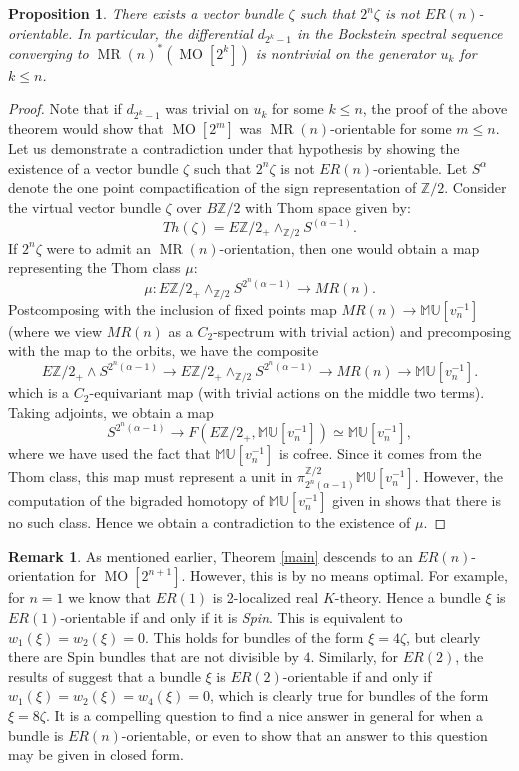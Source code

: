 \documentclass[12pt]{amsart}
\numberwithin{equation}{section}
\theoremstyle{plain}  %
\newtheorem{prop}[equation]{Proposition}
\theoremstyle{definition}  %
\newtheorem{remark}[equation]{Remark}
\newcommand{\Z}{\mathbb{Z}}
\newcommand{\MU}{\mathbb {MU}}
\DeclareMathOperator{\MO}{MO}
\DeclareMathOperator{\MUR}{MR}
\begin{document}
\medskip
\begin{prop} \label{bound}
There exists a vector bundle $\zeta$ such that $2^n \zeta$ is not $ER(n)$-orientable. In particular, the differential $d_{2^k-1}$ in the Bockstein spectral sequence converging to $\MUR(n)^*(\MO[2^k])$ is nontrivial on the generator $u_k$ for $k \leq n$. 
\end{prop}
\begin{proof}
Note that if $d_{2^k-1}$ was trivial on $u_k$ for some $k \leq n$, the proof of the above theorem would show that $\MO[2^m]$ was $\MUR(n)$-orientable for some $m \leq n$. Let us demonstrate a contradiction under that hypothesis by showing the existence of a vector bundle $\zeta$ such that $2^n \zeta$ is not $ER(n)$-orientable. Let $S^{\alpha}$ denote the one point compactification of the sign representation of $\Z/2$. Consider the virtual vector bundle $\zeta$ over $B\Z/2$ with Thom space given by: 
\[ Th(\zeta) = E\Z/2_+ \wedge_{\Z/2} S^{(\alpha-1)}. \] 
If $2^n\zeta$ were to admit an $\MUR(n)$-orientation, then one would obtain a map representing the Thom class $\mu$:
\[ \mu: E\Z/2_+ \wedge_{\Z/2} S^{2^n(\alpha-1)} \longrightarrow MR(n).\]
Postcomposing with the inclusion of fixed points map $MR(n) \longrightarrow \MU[v_n^{-1}]$ (where we view $MR(n)$ as a $C_2$-spectrum with trivial action) and precomposing with the map to the orbits, we have the composite
$$E\Z/2_+ \wedge S^{2^n(\alpha -1)} \longrightarrow E\Z/2_+ \wedge_{\Z/2} S^{2^n(\alpha-1)} \longrightarrow MR(n) \longrightarrow \MU[v_n^{-1}].$$
which is a $C_2$-equivariant map (with trivial actions on the middle two terms). Taking adjoints, we obtain a map
$$S^{2^n(\alpha -1)} \longrightarrow F(E\Z/2_+, \MU[v_n^{-1}])\simeq \MU[v_n^{-1}],$$
where we have used the fact that $\MU[v_n^{-1}]$ is cofree. Since it comes from the Thom class, this map must represent a unit in $\pi_{2^n(\alpha -1)}^{\Z/2}\MU[v_n^{-1}]$. However, the computation of the bigraded homotopy of $\MU[v_n^{-1}]$ given in \cite{HK01} shows that there is no such class. Hence we obtain a contradiction to the existence of $\mu$. 
\end{proof}

\medskip
\begin{remark}
As mentioned earlier, Theorem \ref{main} descends to an $ER(n)$-orientation for $\MO[2^{n+1}]$. However, this is by no means optimal. 
For example, for $n=1$ we know that $ER(1)$ is 2-localized real 
$K$-theory. Hence a bundle $\xi$ is $ER(1)$-orientable if and 
only if it is {\em Spin}. This is equivalent to $w_1(\xi) = w_2(\xi) = 0$. 
This holds for bundles of the form $\xi = 4\zeta$, 
but clearly there are Spin bundles that are not divisible by $4$. Similarly, for $ER(2)$, the results of \cite{KS} suggest that a bundle $\xi$ is $ER(2)$-orientable if and only if $w_1(\xi) = w_2(\xi) = w_4(\xi) = 0$, which is clearly true for bundles of the form $\xi = 8\zeta$. It is a compelling question to find a nice answer in 
general for when a bundle is $ER(n)$-orientable, or even to 
show that an answer to this question may be given in closed form. 
\end{remark}
\end{document}
